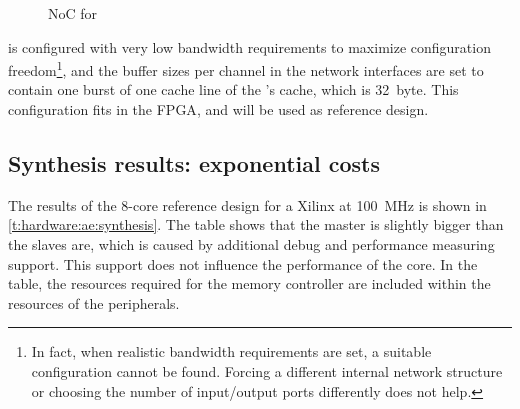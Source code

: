 \begin{figure}%
%
\caption{\AEthereal \acs{NoC}  for \Starburst}%
\label{fig:hardware:ae_soc}%
\end{figure}

\AEthereal is configured with very low bandwidth requirements to maximize configuration freedom\footnote{%
	In fact, when realistic bandwidth requirements are set, a suitable configuration cannot be found.
	Forcing a different internal network structure or choosing the number of input/output ports differently does not help.}, %
and the buffer sizes per channel in the network interfaces are set to contain one burst of one cache line of the \MicroBlaze's cache, which is 32~byte.
This configuration fits in the \ac{FPGA}, and will be used as reference design.

\subsection{Synthesis results: exponential costs}
\label{s:hardware:ae:synthesis}

The  results of the 8-core reference design for a Xilinx \ourVirtex at \SI{100}{\mega\hertz} is shown in \vref{t:hardware:ae:synthesis}.
The table shows that the master \MicroBlaze is slightly bigger than the slaves are, which is caused by additional debug and performance measuring support.
This support does not influence the performance of the core.
In the table, the resources required for the memory controller are included within the resources of the peripherals.



